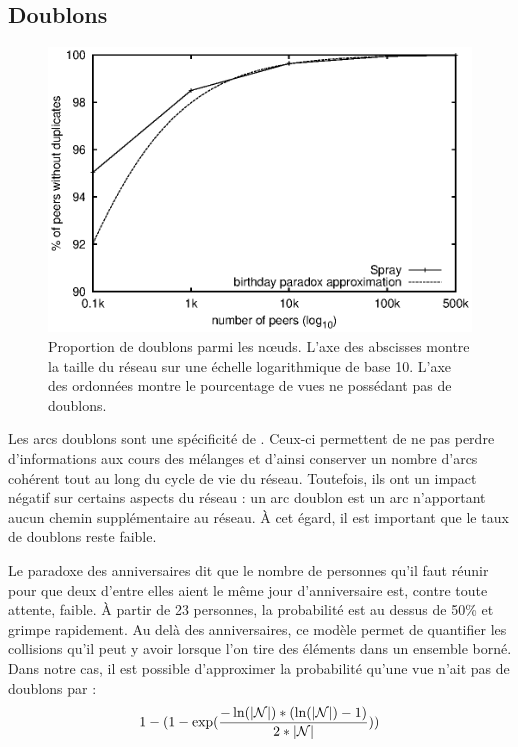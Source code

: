 \subsection{Doublons}
\label{net:subsec:duplicates}

\begin{figure}
  \centering
  \includegraphics[width=.8\textwidth]{img/spray/duplicates.eps}
  \caption{\label{net:fig:duplicates} Proportion de doublons parmi les nœuds.
    L'axe des abscisses montre la taille du réseau sur une échelle logarithmique
    de base 10. L'axe des ordonnées montre le pourcentage de vues ne possédant
    pas de doublons.}
\end{figure}

Les arcs doublons sont une spécificité de \SPRAY. Ceux-ci permettent de ne pas
perdre d'informations aux cours des mélanges et d'ainsi conserver un nombre
d'arcs cohérent tout au long du cycle de vie du réseau. Toutefois, ils ont un
impact négatif sur certains aspects du réseau : un arc doublon est un arc
n'apportant aucun chemin supplémentaire au réseau. À cet égard, il est important
que le taux de doublons reste faible.

Le paradoxe des anniversaires dit que le nombre de personnes qu'il faut réunir
pour que deux d'entre elles aient le même jour d'anniversaire est, contre toute
attente, faible. À partir de 23 personnes, la probabilité est au dessus de 50\%
et grimpe rapidement. Au delà des anniversaires, ce modèle permet de quantifier
les collisions qu'il peut y avoir lorsque l'on tire des éléments dans un
ensemble borné. Dans notre cas, il est possible d'approximer la probabilité
qu'une vue n'ait pas de doublons par :
\begin{equation*}
  1-
  (1-
  \exp({-\ln(|\mathcal{N}|)*(\ln(|\mathcal{N}|)-1)\over{2*|\mathcal{N}|}}))
\end{equation*}

